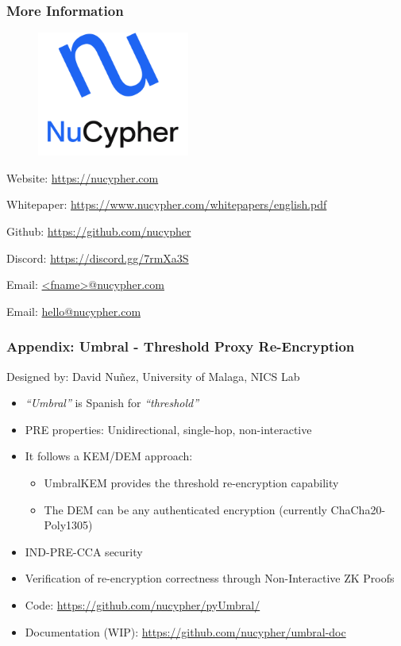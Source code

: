 \documentclass[xetex,mathsans,sans,aspectratio=169]{beamer}
\begin{document}
    \begin{frame}
        \frametitle{More Information}
        \begin{figure}
            \centering
            \includegraphics[width=5cm]{pdf/nucypher_logo.pdf}
        \end{figure}
        Website: \url{https://nucypher.com}

        Whitepaper: \url{https://www.nucypher.com/whitepapers/english.pdf}

        Github: \url{https://github.com/nucypher}

        Discord: \url{https://discord.gg/7rmXa3S}

        Email: \href{mailto:<fname>@nucypher.com}{<fname>@nucypher.com}

        Email: \href{mailto:hello@nucypher.com}{hello@nucypher.com}
    \end{frame}

    \begin{frame}
      \frametitle{Appendix: Umbral - Threshold Proxy Re-Encryption}
      Designed by: David Nu\~{n}ez, University of Malaga, NICS Lab
      \begin{itemize}
          \item \emph{``Umbral''} is Spanish for \emph{``threshold''}
          \item PRE properties: Unidirectional, single-hop, non-interactive
          \item It follows a KEM/DEM approach:
          \begin{itemize}
              \item UmbralKEM provides the threshold re-encryption capability
              \item The DEM can be any authenticated encryption (currently ChaCha20-Poly1305)
          \end{itemize}
          \item IND-PRE-CCA security
          \item Verification of re-encryption correctness through Non-Interactive ZK Proofs
          \item Code: \url{https://github.com/nucypher/pyUmbral/}
          \item Documentation (WIP): \url{https://github.com/nucypher/umbral-doc}
      \end{itemize}
    \end{frame}
\end{document}
